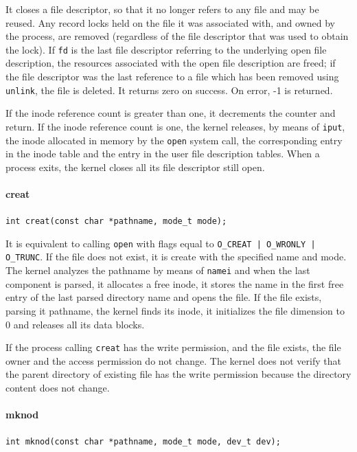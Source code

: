 It closes a file descriptor, so that it no longer refers to any file and may be reused. Any record locks held on the file it was associated with, and owned by the process, are removed (regardless of the file descriptor that was used to obtain the lock). If \texttt{fd} is the last file descriptor referring to the underlying open file description, the resources associated with the open file description are freed; if the file descriptor was the last reference to a file which has been removed using \texttt{unlink}, the file is deleted. It returns zero on success. On error, -1 is returned.

If the inode reference count is greater than one, it decrements the counter and return. If the inode reference count is one, the kernel releases, by means of \texttt{iput}, the inode allocated in memory by the \texttt{open} system call, the corresponding entry in the inode table and the entry in the user file description tables. When a process exits, the kernel closes all its file descriptor still open. 

\paragraph{creat}
\texttt{int creat(const char *pathname, mode\_t mode);}

It is equivalent to calling \texttt{open} with flags equal to \texttt{O\_CREAT | O\_WRONLY | O\_TRUNC}. If the file does not exist, it is create with the specified name and mode. The kernel analyzes the pathname by means of \texttt{namei} and when the last component is parsed, it allocates a free inode, it stores the name in the first free entry of the last parsed directory name and opens the file. If the file exists, parsing it pathname, the kernel finds its inode, it initializes the file dimension to 0 and releases all its data blocks.

If the process calling \texttt{creat} has the write permission, and the file exists, the file owner and the access permission do not change. The kernel does not verify that the parent directory of existing file has the write permission because the directory content does not change.

\paragraph{mknod}
\texttt{int mknod(const char *pathname, mode\_t mode, dev\_t dev);}

